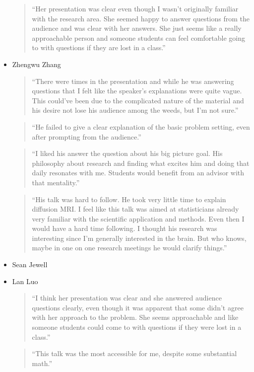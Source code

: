 \documentclass[]{article}
\begin{document}
\begin{itemize}
  \begin{quote}
  ``Her presentation was clear even though I wasn't originally familiar
  with the research area. She seemed happy to answer questions from the
  audience and was clear with her answers. She just seems like a really
  approachable person and someone students can feel comfortable going to
  with questions if they are lost in a class.''
  \end{quote}
\item
  Zhengwu Zhang

  \begin{quote}
  ``There were times in the presentation and while he was answering
  questions that I felt like the speaker's explanations were quite
  vague. This could've been due to the complicated nature of the
  material and his desire not lose his audience among the weeds, but I'm
  not sure.''
  \end{quote}

  \begin{quote}
  ``He failed to give a clear explanation of the basic problem setting,
  even after prompting from the audience.''
  \end{quote}

  \begin{quote}
  ``I liked his answer the question about his big picture goal. His
  philosophy about research and finding what excites him and doing that
  daily resonates with me. Students would benefit from an advisor with
  that mentality.''
  \end{quote}

  \begin{quote}
  ``His talk was hard to follow. He took very little time to explain
  diffusion MRI. I feel like this talk was aimed at statisticians
  already very familiar with the scientific application and methods.
  Even then I would have a hard time following. I thought his research
  was interesting since I'm generally interested in the brain. But who
  knows, maybe in one on one research meetings he would clarify
  things.''
  \end{quote}
\item
  Sean Jewell
\item
  Lan Luo

  \begin{quote}
  ``I think her presentation was clear and she answered audience
  questions clearly, even though it was apparent that some didn't agree
  with her approach to the problem. She seems approachable and like
  someone students could come to with questions if they were lost in a
  class.''
  \end{quote}

  \begin{quote}
  ``This talk was the most accessible for me, despite some substantial
  math.''
  \end{quote}
\end{itemize}
\end{document}
